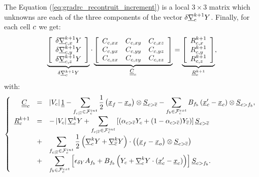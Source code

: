 The Equation (\ref{eq:gradrc_recontruit_increment}) is a local $3 \times 3$ matrix which unknowns are each of the three components of
the vector $\delta \underline{\nabla}_{c}^{k+1} Y$. Finally, for each cell $c$ we get:
%
\begin{equation}\label{eq:eq_systeme_matriciel_gradrc}
\underbrace{
\left[\begin{array}{c}
\delta \underline{\nabla}_{c ,x}^{k+1} Y\\
\delta \underline{\nabla}_{c ,y}^{k+1} Y\\
\delta \underline{\nabla}_{c ,z}^{k+1} Y
\end{array}\right]
}_{\delta \underline{\nabla}_{c}^{k+1} Y }
\cdot
\underbrace{
\left[\begin{array}{ccc}
\displaystyle
  C_{c , xx}
& C_{c , xy}
& C_{c , xz}\\
\displaystyle
  C_{c , yx}
& C_{c , yy}
& C_{c , yz}\\
\displaystyle
  C_{c , zx}
& C_{c , zy}
& C_{c , zz}
\end{array}\right]
}_{\underline{\underline{C}}_{c}}
=
\underbrace{
\left[\begin{array}{c}
\displaystyle
R^{k+1}_{c ,x}\\
\displaystyle
R^{k+1}_{c ,y}\\
\displaystyle
R^{k+1}_{c ,z}
\end{array}\right]
}_{\underline{R}^{k+1}_{c}} ,
\end{equation}
%
with:
%
\begin{equation}\label{eq:eq_second_membre_gradrc}
\left\{\begin{array}{rcl}
\underline{\underline{C}}_c  &=&
\displaystyle
\left| V_{c} \right| \underline{\underline{1}} -
\sum\limits_{ {{f}_{c|{\overline{c}}}} \in \mathcal{F}^{int}_{c}} \frac{1}{2}  \left(\underline{x}_{{f}} - \underline{x}_o\right) \otimes \underline{S}_{{c > {\overline{c}}}} -
\sum\limits_{ {{f}_{b}} \in \mathcal{F}^{ext}_{c}} B_{{{f}_{b}}} \left(\underline{x}_{c}^\prime - {\underline{x}_{c}}\right)  \otimes \underline{S}_{{c>{{f}_{b}}}} ,\\
\underline{R}^{k+1}_{c} &=&
\displaystyle
 -\left| V_{c} \right|  \underline{\nabla}_{c}^{k} Y +
\sum\limits_{{{f}_{c|{\overline{c}}}} \in \mathcal{F}^{int}_{c}}\left[
(\alpha_{{c > {\overline{c}}}} Y_c + (1 - \alpha_{{c > {\overline{c}}}}) Y_{{\overline{c}}})\right] \underline{S}_{{c > {\overline{c}}}} \\
&+& \displaystyle
\sum\limits_{{{f}_{c|{\overline{c}}}} \in \mathcal{F}^{int}_{c}} \frac{1}{2}
\left(\underline{\nabla}_c^k Y + \underline{\nabla}_{{\overline{c}}}^k Y \right) \cdot \left( \left(\underline{x}_{{f}} - \underline{x}_o\right) \otimes \underline{S}_{{c > {\overline{c}}}} \right) \\
&+& \displaystyle
\sum\limits_{{{f}_{b}} \in \mathcal{F}^{ext}_{c}}\left[ \epsilon_{\delta Y} A_{{{f}_{b}}}
+ B_{{{f}_{b}}} \left( Y_{c} + \underline{\nabla}_{c}^k Y \cdot \left(\underline{x}_{c}^\prime - {\underline{x}_{c}}\right) \right)  \right] \underline{S}_{{c>{{f}_{b}}}} .
\end{array}\right.
\end{equation}

